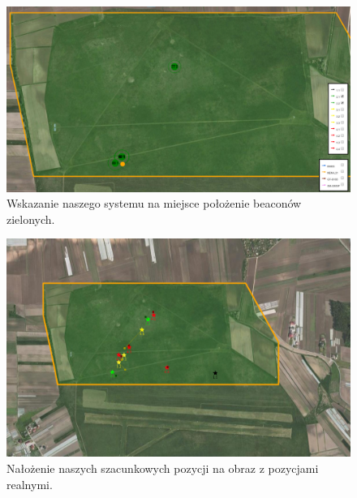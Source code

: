\begin{figure}[!th]
    \centering
    \includegraphics[width=15cm]{zalaczniki/obrazy/wskazanie_zielone.png}
    \caption{Wskazanie naszego systemu na miejsce położenie beaconów zielonych.}
    \label{fig:wskazaniezielone}
\end{figure}
\begin{figure}[!th]
    \centering
    \includegraphics[width=15cm]{zalaczniki/obrazy/beacony_konkursowe_nasze.png}
    \caption{Nałożenie naszych szacunkowych pozycji na obraz z pozycjami realnymi.}
    \label{fig:beaconykonkursowenasze}
\end{figure}

